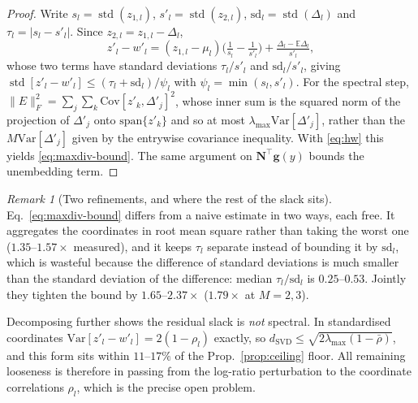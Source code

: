 \documentclass[10pt,letterpaper,twocolumn]{article}
\newcommand{\DONE}[1]{}
\newcommand{\bfg}{\mathbf{g}}
\newcommand{\bfN}{\mathbf{N}}
\newcommand{\dSVD}{d_{\mathrm{SVD}}}
\newcommand{\Var}{\mathrm{Var}}
\newcommand{\Cov}{\mathrm{Cov}}
\theoremstyle{plain}
\theoremstyle{definition}
\theoremstyle{remark}
\newtheorem{remark}[theorem]{Remark}
\begin{document}
\begin{proof}
Write $s_{l}=\operatorname{std}(z_{1,l})$, $s'_{l}=\operatorname{std}(z_{2,l})$,
$\mathrm{sd}_{l}=\operatorname{std}(\Delta_{l})$ and
$\tau_{l}=|s_{l}-s'_{l}|$. Since $z_{2,l}=z_{1,l}-\Delta_{l}$,
\[
z'_{l}-w'_{l}=(z_{1,l}-\mu_{l})\Big(\tfrac1{s_{l}}-\tfrac1{s'_{l}}\Big)
+\tfrac{\Delta_{l}-\mathbb{E}\Delta_{l}}{s'_{l}},
\]
whose two terms have standard deviations $\tau_{l}/s'_{l}$ and
$\mathrm{sd}_{l}/s'_{l}$, giving
$\operatorname{std}[z'_{l}-w'_{l}]\le(\tau_{l}+\mathrm{sd}_{l})/\psi_{l}$ with
$\psi_{l}=\min(s_{l},s'_{l})$. For the spectral step,
$\|E\|_{F}^{2}=\sum_{j}\sum_{k}\Cov[z'_{k},\Delta'_{j}]^{2}$, whose inner sum
is the squared norm of the projection of $\Delta'_{j}$ onto
$\mathrm{span}\{z'_{k}\}$ and so at most $\lambda_{\max}\Var[\Delta'_{j}]$,
rather than the $M\Var[\Delta'_{j}]$ given by the entrywise covariance
inequality. With \eqref{eq:hw} this yields \eqref{eq:maxdiv-bound}. The same
argument on $\bfN^{\top}\bfg(y)$ bounds the unembedding term.
\end{proof}

\begin{remark}[Two refinements, and where the rest of the slack sits]
\label{rem:tighten}
Eq.~\eqref{eq:maxdiv-bound} differs from a naive estimate in two ways, each
free. It aggregates the coordinates in root mean square rather than taking the
worst one ($1.35$--$1.57\times$ measured), and it keeps $\tau_{l}$ separate
instead of bounding it by $\mathrm{sd}_{l}$, which is wasteful because the
difference of standard deviations is much smaller than the standard deviation
of the difference: median $\tau_{l}/\mathrm{sd}_{l}$ is $0.25$--$0.53$. Jointly
they tighten the bound by $1.65$--$2.37\times$ ($1.79\times$ at $M=2,3$).

Decomposing further shows the residual slack is \emph{not} spectral. In
standardised coordinates $\Var[z'_{l}-w'_{l}]=2(1-\rho_{l})$ exactly, so
$\dSVD\le\sqrt{2\lambda_{\max}(1-\bar\rho)}$, and this form sits within
$11$--$17\%$ of the Prop.~\ref{prop:ceiling} floor. All remaining looseness is
therefore in passing from the log-ratio perturbation to the coordinate
correlations $\rho_{l}$, which is the precise open problem.
\end{remark}

\DONE{$0/139$ violations on constructed models and $0/45$ on CIFAR-10. On the
retrained networks of Sec.~\ref{sec:exp-cifar} the refinements move the median
bound from $1.558$ to $\mathbf{0.931}$, a $1.67\times$ gain, taking the
non-vacuity rate from $\mathbf{0\%}$ to $\mathbf{58\%}$: the bound now
certifies a majority of independently retrained pairs.}
\end{document}

